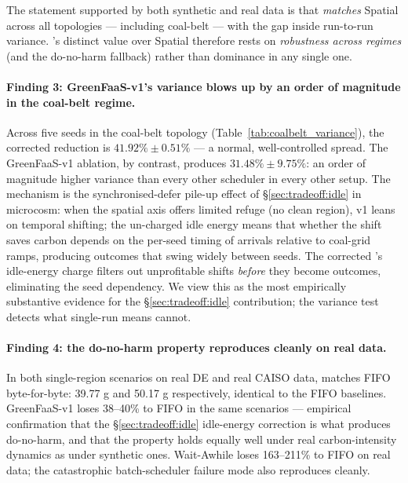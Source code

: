 The statement supported by both synthetic and real data is that
\GreenFaaS{} \emph{matches} Spatial across all topologies ---
including coal-belt --- with the gap inside run-to-run variance.
\GreenFaaS's distinct value over Spatial therefore rests on
\emph{robustness across regimes} (and the do-no-harm fallback) rather
than dominance in any single one.

\paragraph{Finding 3: GreenFaaS-v1's variance blows up by an order of
magnitude in the coal-belt regime.} Across five seeds in the coal-belt
topology (Table~\ref{tab:coalbelt_variance}), the corrected
\GreenFaaS{} reduction is $41.92\% \pm 0.51\%$ --- a normal,
well-controlled spread. The GreenFaaS-v1 ablation, by contrast,
produces $31.48\% \pm \mathbf{9.75\%}$: an order of magnitude
higher variance than every other scheduler in every other setup. The
mechanism is the synchronised-defer pile-up effect of
\S\ref{sec:tradeoff:idle} in microcosm: when the spatial axis offers
limited refuge (no clean region), v1 leans on temporal shifting; the
un-charged idle energy means that whether the shift saves carbon
depends on the per-seed timing of arrivals relative to coal-grid
ramps, producing outcomes that swing widely between seeds. The
corrected \GreenFaaS{}'s idle-energy charge filters out unprofitable
shifts \emph{before} they become outcomes, eliminating the seed
dependency. We view this as the most empirically substantive evidence
for the \S\ref{sec:tradeoff:idle} contribution; the variance test
detects what single-run means cannot.

\paragraph{Finding 4: the do-no-harm property reproduces cleanly on
real data.} In both single-region scenarios on real DE and real CAISO
data, \GreenFaaS{} matches FIFO byte-for-byte: 39.77 g and 50.17 g
respectively, identical to the FIFO baselines. GreenFaaS-v1 loses
38--40\% to FIFO in the same scenarios --- empirical confirmation that
the \S\ref{sec:tradeoff:idle} idle-energy correction is what produces
do-no-harm, and that the property holds equally well under real
carbon-intensity dynamics as under synthetic ones. Wait-Awhile loses
163--211\% to FIFO on real data; the catastrophic batch-scheduler
failure mode also reproduces cleanly.

